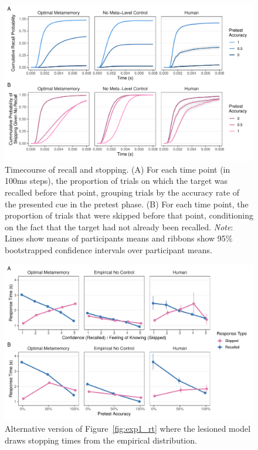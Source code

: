 \begin{figure}[]
  \includegraphics[scale=.75]{figs/memory/exp1/cum_probs.pdf}
  \caption{%
    Timecourse of recall and stopping.
    (A) For each time point (in 100ms steps), the proportion of trials on which the target was recalled before that point, grouping trials by the accuracy rate of the presented cue in the pretest phase.
    (B) For each time point, the proportion of trials that were skipped before that point, conditioning on the fact that the target had not already been recalled.
    \emph{Note}: Lines show means of participants means and ribbons show 95\% bootstrapped confidence intervals over participant means.
  }
  \label{fig:exp1_cum}
\end{figure}


\begin{figure}[]
  \includegraphics[scale=.75]{figs/memory/exp1_alt/rt.pdf}
  \caption{Alternative version of Figure~\ref{fig:exp1_rt} where the lesioned model draws stopping times from the empirical distribution.}
  \label{fig:exp1_rt_alt}
\end{figure}

